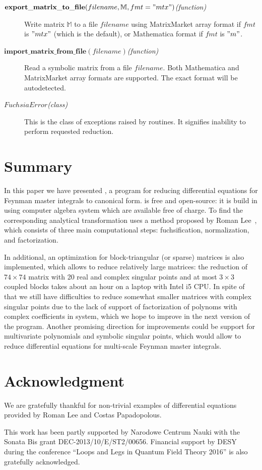 \documentclass[12pt,a4paper]{article}
\def\F#1{\mathbf{#1}} %
\def\M#1{\mathbb{#1}} %
\def\functionitem#1#2{\item[$\F{#1}(#2)$\hfill\textit{(function)}]}
\def\classitem#1{\item[$#1$\hfill\textit{(class)}]}
\begin{document}
\begin{description}
\functionitem{export\_matrix\_to\_file}{filename, \M M, fmt="mtx"}
Write matrix $\M M$ to a file $filename$ using MatrixMarket array format if $fmt$ is $"mtx"$ (which is the default), or Mathematica format if $fmt$ is $"m"$.

\functionitem{import\_matrix\_from\_file}{filename}
Read a symbolic matrix from a file $filename$.
Both Mathematica and MatrixMarket array formats are supported.
The exact format will be autodetected.

\classitem{FuchsiaError}
This is the class of exceptions raised by \fuchsia routines.
It signifies inability to perform requested reduction. 

\end{description}


\section{Summary}
\label{sec:4}

In this paper we have presented \fuchsia, a program for reducing differential equations for Feynman master integrals to canonical form.
\fuchsia is free and open-source: it is build in \python using \maximasage computer algebra system which are available free of charge.
To find the corresponding analytical transformation \fuchsia uses a method proposed by Roman Lee~\cite{Lee15}, which consists of three main computational steps: fuchsification, normalization, and factorization.

In additional, an optimization for block-triangular (or sparse) matrices is also implemented, which allows to reduce relatively large matrices: the reduction of ${74\times74}$ matrix with 20 real and complex singular points and at most $3\times3$ coupled blocks takes about an hour on a laptop with Intel i5 CPU.
In spite of that we still have difficulties to reduce somewhat smaller matrices with complex singular points due to the lack of support of factorization of polynoms with complex coefficients in \maximasage system, which we hope to improve in the next version of the program.
Another promising direction for improvements could be support for multivariate polynomials and symbolic singular points, which would allow to reduce differential equations for multi-scale Feynman master integrals.

\section*{Acknowledgment}

We are gratefully thankful for non-trivial examples of differential equations provided by Roman Lee and Costas Papadopolous.

This work has been partly supported by Narodowe Centrum Nauki with the Sonata Bis grant DEC-2013/10/E/ST2/00656.
Financial support by DESY during the conference ``Loops and Legs in Quantum Field Theory 2016'' is also gratefully acknowledged. 


\end{document}
